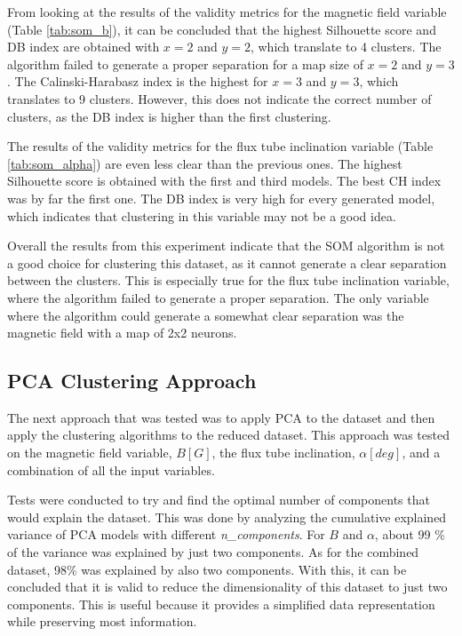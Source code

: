 From looking at the results of the validity metrics for the magnetic field variable (Table \ref{tab:som_b}), it can be concluded that the highest Silhouette score and DB index are obtained with $x=2$ and $y=2$, which translate to 4 clusters. The algorithm failed to generate a proper separation for a map size of $x=2$ and $y=3$. The Calinski-Harabasz index is the highest for $x=3$ and $y=3$, which translates to 9 clusters. However, this does not indicate the correct number of clusters, as the DB index is higher than the first clustering.

The results of the validity metrics for the flux tube inclination variable (Table \ref{tab:som_alpha}) are even less clear than the previous ones. The highest Silhouette score is obtained with the first and third models. The best CH index was by far the first one. The DB index is very high for every generated model, which indicates that clustering in this variable may not be a good idea.

Overall the results from this experiment indicate that the SOM algorithm is not a good choice for clustering this dataset, as it cannot generate a clear separation between the clusters. This is especially true for the flux tube inclination variable, where the algorithm failed to generate a proper separation. The only variable where the algorithm could generate a somewhat clear separation was the magnetic field with a map of 2x2 neurons.


\subsection{PCA Clustering Approach}\label{sec:pca_clustering}
The next approach that was tested was to apply PCA to the dataset and then apply the clustering algorithms to the reduced dataset. This approach was tested on the magnetic field variable, $B[G]$, the flux tube inclination, $\alpha [deg]$, and a combination of all the input variables. 

Tests were conducted to try and find the optimal number of components that would explain the dataset. This was done by analyzing the cumulative explained variance of PCA models with different \textit{n\_components}. For $B$ and $\alpha$, about 99 \% of the variance was explained by just two components. As for the combined dataset, 98\% was explained by also two components. With this, it can be concluded that it is valid to reduce the dimensionality of this dataset to just two components. This is useful because it provides a simplified data representation while preserving most information. 

